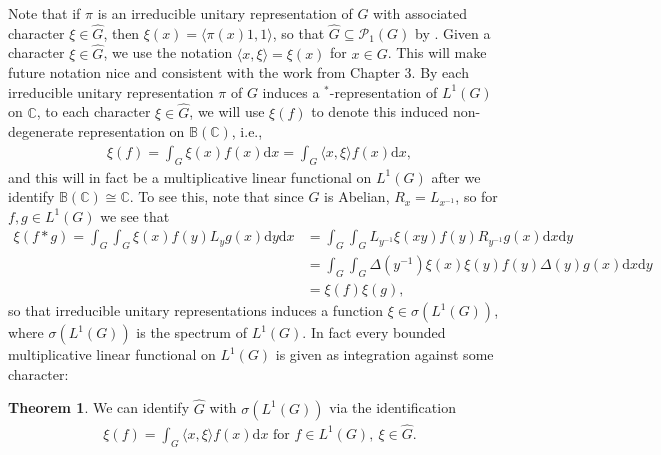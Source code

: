 \documentclass[10pt,twoside,openany,final]{memoir}
\theoremstyle{definition}
\newtheorem{theorem}{Theorem}[chapter]
\theoremstyle{Break}
\newcommand{\C}{\mathbb{C}}
\renewcommand{\P}{\mathcal{P}}
\renewcommand{\d}{\mathrm{d}}
\begin{document}
Note that if $\pi$ is an irreducible unitary representation of $G$ with associated character $\xi \in \widehat{G}$, then $\xi(x)=\langle \pi(x) 1,1\rangle$, so that $\widehat{G}\subseteq \P_1(G)$ by . Given a character $\xi \in \widehat{G}$, we use the notation $\langle x,\xi\rangle=\xi(x)$ for $x \in G$. This will make future notation nice and consistent with the work from Chapter 3. By  each irreducible unitary representation $\pi$ of $G$ induces a $^*$-representation of $L^1(G)$ on $\C$, to each character $\xi \in \widehat{G}$, we will use $\xi(f)$ to denote this induced non-degenerate representation on $\mathbb{B}(\C)$, i.e., 
\begin{align*}
	\xi(f)=\int_G \xi(x) f(x) \d x = \int_G \langle x,\xi\rangle f(x) \d x,
\end{align*}
and this will in fact be a multiplicative linear functional on $L^1(G)$ after we identify $\mathbb{B}(\C)\cong \C$. To see this, note that since $G$ is Abelian, $R_x=L_{x^{-1}}$, so for $f,g \in L^1(G)$ we see that
\begin{align*}
	\xi(f \ast g)=\int_G \int_G \xi(x) f(y) L_y g(x) \d y \d x &= \int_G \int_G L_{y^{-1}} \xi(xy) f(y) R_{y^{-1}} g(x) \d x \d y\\
	&= \int_G\int_G \Delta(y^{-1}) \xi(x)\xi(y) f(y) \Delta(y) g(x) \d x \d y\\
	&=\xi(f) \xi(g),
\end{align*}
so that irreducible unitary representations induces a function $\xi \in \sigma(L^1(G))$, where $\sigma(L^1(G))$ is the spectrum of $L^1(G)$. In fact every bounded multiplicative linear functional on $L^1(G)$ is given as integration against some character:
\begin{theorem}
	We can identify $\widehat{G}$ with $\sigma(L^1(G))$ via the identification
	\begin{align*}
		\xi(f)=\int_G \langle x,\xi \rangle f(x) \d x \text{ for } f \in L^1(G), \ \xi \in \widehat{G}.
	\end{align*}
	\label{4.1}
\end{theorem}
\end{document}

